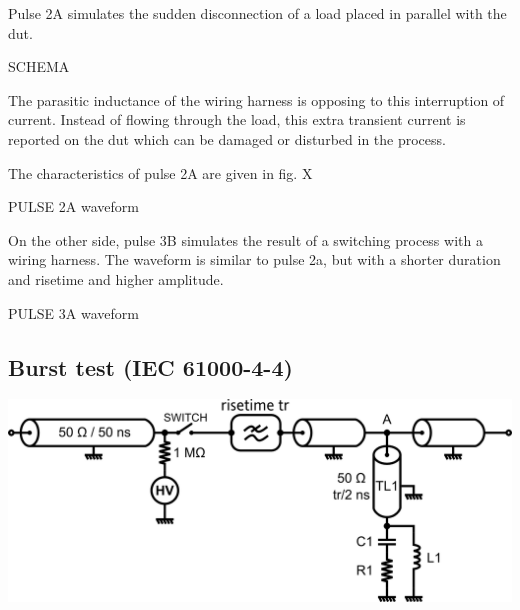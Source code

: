 Pulse 2A simulates the sudden disconnection of a load placed in parallel with the \gls{dut}.

SCHEMA

The parasitic inductance of the wiring harness is opposing to this interruption of current.
Instead of flowing through the load, this extra transient current is reported on the \gls{dut} which can be damaged or disturbed in the process.

The characteristics of pulse 2A are given in fig. X

PULSE 2A waveform

On the other side, pulse 3B simulates the result of a switching process with a wiring harness.
The waveform is similar to pulse 2a, but with a shorter duration and risetime and higher amplitude.

PULSE 3A waveform

\subsection{Burst test (IEC 61000-4-4)}

\includegraphics[width=\textwidth,height=\textheight,keepaspectratio]{src/2/figures/tlp_iec.png}
